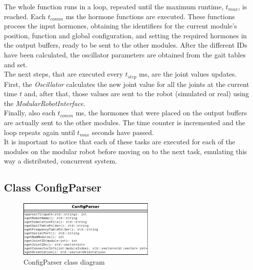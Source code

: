The whole function runs in a loop, repeated until the maximum runtime, $t_{max}$, is reached. Each $t_{comm}$ ms the hormone functions are executed. These functions process the input hormones, obtaining the identifiers for the current module's position, function and global configuration, and setting the required hormones in the output buffers, ready to be sent to the other modules. After the different IDs have been calculated, the oscillator parameters are obtained from the gait tables and set.\\

The next steps, that are executed every $t_{step}$ ms, are the joint values updates. First, the \emph{Oscillator} calculates the new joint value for all the joints at the current time $t$ and, after that, those values are sent to the robot (simulated or real) using the \emph{ModularRobotInterface}.\\

Finally, also each $t_{comm}$ ms, the hormones that were placed on the output buffers are actually sent to the other modules. The time counter is incremented and the loop repeats again until $t_{max}$ seconds have passed.\\

It is important to notice that each of these tasks are executed for each of the modules on the modular robot before moving on to the next task, emulating this way a distributed, concurrent system.\\ 


\subsection{Class ConfigParser}
\label{software_class_configparser}


\begin{figure}[h]
		\centering
        \includegraphics[width=0.6\textwidth]{images/Class_diagram_ConfigParser_members.png}
        \caption{ConfigParser class diagram}\label{fig:software_class_configparser_class}
\end{figure}

